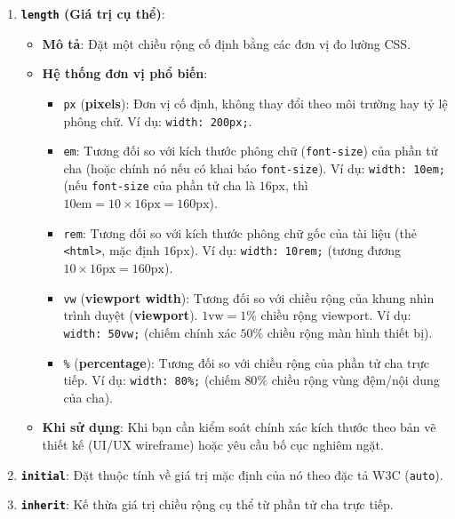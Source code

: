 \documentclass[11pt,oneside]{book}
\newcommand{\codeinline}[1]{\textcolor{accentOrange}{\texttt{#1}}}
\newcommand{\term}[1]{\textbf{\textcolor{primaryBlue}{#1}}}
\begin{document}
\begin{enumerate}[leftmargin=1.5em, itemsep=6pt, parsep=0pt]
    \item \textbf{\codeinline{length} (Giá trị cụ thể)}:
    \begin{itemize}[leftmargin=1.2em, itemsep=3pt, parsep=0pt]
        \item \textbf{Mô tả}: Đặt một chiều rộng cố định bằng các đơn vị đo lường CSS.
        \item \textbf{Hệ thống đơn vị phổ biến}:
        \begin{itemize}[leftmargin=1.2em, itemsep=3pt, parsep=0pt]
            \item \codeinline{px} (\term{pixels}): Đơn vị cố định, không thay đổi theo môi trường hay tỷ lệ phông chữ. Ví dụ: \codeinline{width: 200px;}.
            \item \codeinline{em}: Tương đối so với kích thước phông chữ (\codeinline{font-size}) của phần tử cha (hoặc chính nó nếu có khai báo \codeinline{font-size}). Ví dụ: \codeinline{width: 10em;} (nếu \codeinline{font-size} của phần tử cha là $16\text{px}$, thì $10\text{em} = 10 \times 16\text{px} = 160\text{px}$).
            \item \codeinline{rem}: Tương đối so với kích thước phông chữ gốc của tài liệu (thẻ \codeinline{<html>}, mặc định $16\text{px}$). Ví dụ: \codeinline{width: 10rem;} (tương đương $10 \times 16\text{px} = 160\text{px}$).
            \item \codeinline{vw} (\term{viewport width}): Tương đối so với chiều rộng của khung nhìn trình duyệt (\term{viewport}). $1\text{vw} = 1\%$ chiều rộng viewport. Ví dụ: \codeinline{width: 50vw;} (chiếm chính xác $50\%$ chiều rộng màn hình thiết bị).
            \item \codeinline{\%} (\term{percentage}): Tương đối so với chiều rộng của phần tử cha trực tiếp. Ví dụ: \codeinline{width: 80\%;} (chiếm $80\%$ chiều rộng vùng đệm/nội dung của cha).
        \end{itemize}
        \item \textbf{Khi sử dụng}: Khi bạn cần kiểm soát chính xác kích thước theo bản vẽ thiết kế (UI/UX wireframe) hoặc yêu cầu bố cục nghiêm ngặt.
    \end{itemize}

    \item \textbf{\codeinline{initial}}: Đặt thuộc tính về giá trị mặc định của nó theo đặc tả W3C (\codeinline{auto}).
    \item \textbf{\codeinline{inherit}}: Kế thừa giá trị chiều rộng cụ thể từ phần tử cha trực tiếp.
\end{enumerate}
\end{document}
